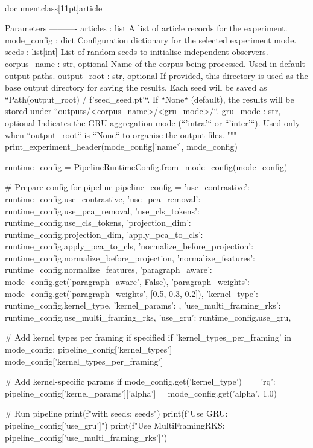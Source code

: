 \\documentclass[11pt]{article}
\begin{document}
\begin{CodeBlock}
    Parameters
    ----------
    articles : list
        A list of article records for the experiment.
    mode_config : dict
        Configuration dictionary for the selected experiment mode.
    seeds : list[int]
        List of random seeds to initialise independent observers.
    corpus_name : str, optional
        Name of the corpus being processed. Used in default output paths.
    output_root : str, optional
        If provided, this directory is used as the base output directory for
        saving the results. Each seed will be saved as
        ``Path(output_root) / f'seed_{seed}.pt'``. If ``None`` (default),
        the results will be stored under ``outputs/<corpus_name>/<gru_mode>/``.
    gru_mode : str, optional
        Indicates the GRU aggregation mode (``'intra'`` or ``'inter'``). Used
        only when ``output_root`` is ``None`` to organise the output files.
    """
    print_experiment_header(mode_config['name'], mode_config)
    
    runtime_config = PipelineRuntimeConfig.from_mode_config(mode_config)

    # Prepare config for pipeline
    pipeline_config = {
        'use_contrastive': runtime_config.use_contrastive,
        'use_pca_removal': runtime_config.use_pca_removal,
        'use_cls_tokens': runtime_config.use_cls_tokens,
        'projection_dim': runtime_config.projection_dim,
        'apply_pca_to_cls': runtime_config.apply_pca_to_cls,
        'normalize_before_projection': runtime_config.normalize_before_projection,
        'normalize_features': runtime_config.normalize_features,
        'paragraph_aware': mode_config.get('paragraph_aware', False),
        'paragraph_weights': mode_config.get('paragraph_weights', [0.5, 0.3, 0.2]),
        'kernel_type': runtime_config.kernel_type,
        'kernel_params': {},
        'use_multi_framing_rks': runtime_config.use_multi_framing_rks,
        'use_gru': runtime_config.use_gru,
    }
    
    # Add kernel types per framing if specified
    if 'kernel_types_per_framing' in mode_config:
        pipeline_config['kernel_types'] = mode_config['kernel_types_per_framing']
    
    # Add kernel-specific params
    if mode_config.get('kernel_type') == 'rq':
        pipeline_config['kernel_params']['alpha'] = mode_config.get('alpha', 1.0)
    
    # Run pipeline
    print(f"\nRunning with seeds: {seeds}")
    print(f"Use GRU: {pipeline_config['use_gru']}")
    print(f"Use MultiFramingRKS: {pipeline_config['use_multi_framing_rks']}")
    

\end{CodeBlock}
\end{document}
